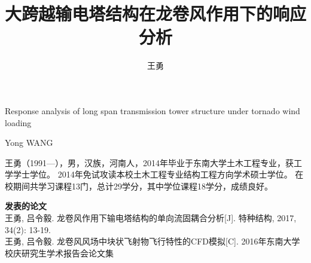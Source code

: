 \documentclass[masters,nocolorlinks]{seuthesix}
\begin{document}
\title{大跨越输电塔结构在龙卷风作用下的响应分析}{}{Response analysis of long span transmission tower structure under tornado wind loading}{}
\author{王勇}{Yong WANG}
\authorizedate{}
\seuthesisthanks{}

\makebigcover
\makecover



\tableofcontents

\mainmatter








\acknowledgement


\appendix






 王勇（1991—），男，汉族，河南人，2014年毕业于东南大学土木工程专业，获工学学士学位。
 2014年免试攻读本校土木工程专业结构工程方向学术硕士学位。
 在校期间共学习课程13门，总计29学分，其中学位课程18学分，成绩良好。

\begin{flushleft}
{\bfseries \large 发表的论文}\\ \relax
[1] 王勇, 吕令毅. 龙卷风作用下输电塔结构的单向流固耦合分析[J]. 特种结构, 2017, 34(2): 13-19.
\\ \relax
[2] 王勇, 吕令毅. 龙卷风风场中块状飞射物飞行特性的CFD模拟[C]. 2016年东南大学校庆研究生学术报告会论文集
\\
 
\end{flushleft}
\end{document}
